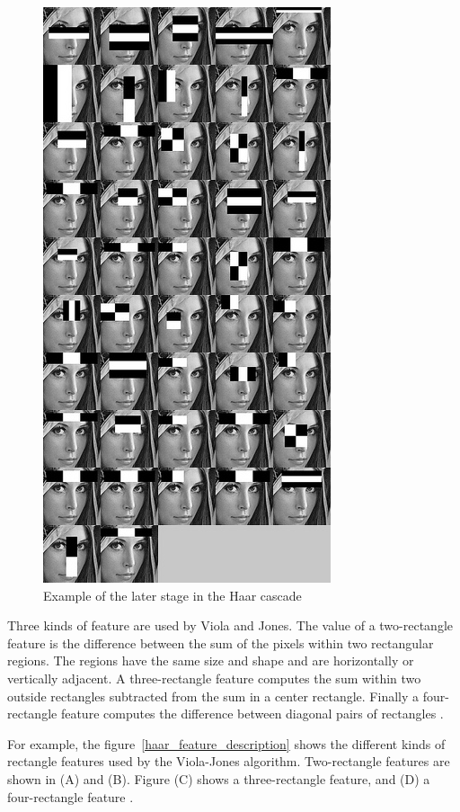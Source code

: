 \begin{figure}[!h]
\begin{center}
\noindent \includegraphics[scale=0.8]{figures/haar_feature_later_stage} 
\newline
\caption{Example of the later stage in the Haar cascade}
\label{haar_feature_later_stage}
\end{center} 
\end{figure}

\noindent Three kinds of feature are used by Viola and Jones. The value of a two-rectangle feature is the difference between the sum of the pixels within two rectangular regions. The regions have the same size and shape and are horizontally or vertically adjacent. A three-rectangle feature computes the sum within two outside rectangles subtracted from the sum in a center rectangle. Finally a four-rectangle feature computes the difference between diagonal pairs of rectangles \cite{VIO01}.
\newline

\noindent For example, the figure~\ref{haar_feature_description} shows the different kinds of rectangle features used by the Viola-Jones algorithm. Two-rectangle features are shown in (A) and (B). Figure (C) shows a three-rectangle feature, and (D) a four-rectangle feature \cite{VIO01}.
\newline

